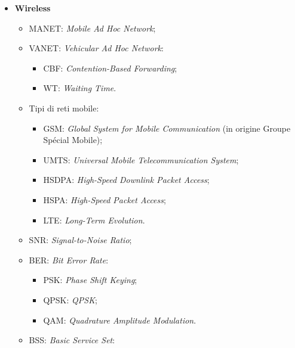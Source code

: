 \begin{itemize}
\begin{itemize}
\begin{itemize}
\end{itemize}

\end{itemize}

\item{\textbf{Wireless}}

\begin{itemize}

\item{MANET}: \emph{Mobile Ad Hoc Network};
\item{VANET}: \emph{Vehicular Ad Hoc Network}:

\begin{itemize}

\item{CBF}: \emph{Contention-Based Forwarding};
\item{WT}: \emph{Waiting Time}.

\end{itemize}

\item{Tipi di reti mobile}:

\begin{itemize}

\item{GSM}: \emph{Global System for Mobile Communication} (in origine Groupe Spécial Mobile);
\item{UMTS}: \emph{Universal Mobile Telecommunication System};
\item{HSDPA}: \emph{High-Speed Downlink Packet Access};
\item{HSPA}: \emph{High-Speed Packet Access};
\item{LTE}: \emph{Long-Term Evolution}.

\end{itemize}

\item{SNR}: \emph{Signal-to-Noise Ratio};
\item{BER}: \emph{Bit Error Rate}:

\begin{itemize}

\item{PSK}: \emph{Phase Shift Keying};
\item{QPSK}: \emph{QPSK};
\item{QAM}: \emph{Quadrature Amplitude Modulation}.

\end{itemize}

\item{BSS}: \emph{Basic Service Set}:


\end{itemize}
\end{itemize}
